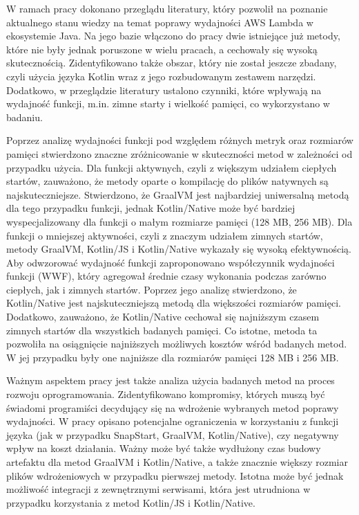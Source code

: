 W ramach pracy dokonano przeglądu literatury, który pozwolił na poznanie aktualnego stanu wiedzy na temat poprawy wydajności AWS Lambda w ekosystemie Java.
Na jego bazie włączono do pracy dwie istniejące już metody, które nie były jednak poruszone w wielu pracach, a cechowały się wysoką skutecznością.
Zidentyfikowano także obszar, który nie został jeszcze zbadany, czyli użycia języka Kotlin wraz z jego rozbudowanym zestawem narzędzi.
Dodatkowo, w przeglądzie literatury ustalono czynniki, które wpływają na wydajność funkcji, m.in. zimne starty i wielkość pamięci, co wykorzystano w badaniu.

Poprzez analizę wydajności funkcji pod względem różnych metryk oraz rozmiarów pamięci stwierdzono znaczne zróżnicowanie w skuteczności metod w zależności od przypadku użycia.
Dla funkcji aktywnych, czyli z większym udziałem ciepłych startów, zauważono, że metody oparte o kompilację do plików natywnych są najskuteczniejsze.
Stwierdzono, że GraalVM jest najbardziej uniwersalną metodą dla tego przypadku funkcji, jednak Kotlin/Native może być bardziej wyspecjalizowany dla funkcji o małym rozmiarze pamięci (128 MB, 256 MB).
Dla funkcji o mniejszej aktywności, czyli z znaczym udziałem zimnych startów, metody GraalVM, Kotlin/JS i Kotlin/Native wykazały się wysoką efektywnością.
Aby odwzorować wydajność funkcji zaproponowano współczynnik wydajności funkcji (WWF), który agregował średnie czasy wykonania podczas zarówno ciepłych, jak i zimnych startów.
Poprzez jego analizę stwierdzono, że Kotlin/Native jest najskuteczniejszą metodą dla większości rozmiarów pamięci.
Dodatkowo, zauważono, że Kotlin/Native cechował się najniższym czasem zimnych startów dla wszystkich badanych pamięci.
Co istotne, metoda ta pozwoliła na osiągnięcie najniższych możliwych kosztów wśród badanych metod.
W jej przypadku były one najniższe dla rozmiarów pamięci 128 MB i 256 MB.

Ważnym aspektem pracy jest także analiza użycia badanych metod na proces rozwoju oprogramowania.
Zidentyfikowano kompromisy, których muszą być świadomi programiści decydujący się na wdrożenie wybranych metod poprawy wydajności.
W pracy opisano potencjalne ograniczenia w korzystaniu z funkcji języka (jak w przypadku SnapStart, GraalVM, Kotlin/Native), czy negatywny wpływ na koszt działania.
Ważny może być także wydłużony czas budowy artefaktu dla metod GraalVM i Kotlin/Native, a także znacznie większy rozmiar plików wdrożeniowych w przypadku pierwszej metody.
Istotna może być jednak możliwość integracji z zewnętrznymi serwisami, która jest utrudniona w przypadku korzystania z metod Kotlin/JS i Kotlin/Native.

